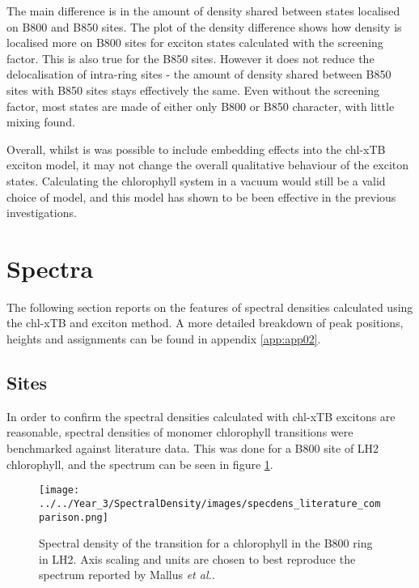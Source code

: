 The main difference is in the amount of density shared between states localised 
on B800 and B850 sites. The plot of the density difference shows how density is 
localised more on B800 sites for exciton states calculated with the screening
factor. This is also true for the B850 sites. However it does not reduce the delocalisation
of intra-ring sites - the amount of density shared between B850 sites with B850 
sites stays effectively the same. Even without the screening factor, most states
are made of either only B800 or B850 character, with little mixing found.

Overall, whilst is was possible to include embedding effects into the chl-xTB exciton
model, it may not change the overall qualitative behaviour of the exciton states.
Calculating the chlorophyll system in a vacuum would still be a valid choice of
model, and this model has shown to be been effective in the previous investigations.

\section{Spectra}
\label{sec:sites_states_couplings}

The following section reports on the features of spectral densities calculated using
the chl-xTB and exciton method. A more detailed breakdown of peak positions, heights
and assignments can be found in appendix \ref{app:app02}.

\subsection{Sites}
\label{subsec:sites}

In order to confirm the spectral densities calculated with chl-xTB excitons are 
reasonable, spectral densities of monomer chlorophyll \Qy transitions were benchmarked 
against literature data. This was done for a B800 site of LH2 chlorophyll, and the
spectrum can be seen in figure \ref{fig:specdens_lit}.

\begin{figure}
    \centering
    \texttt{[image: ../../Year\_3/SpectralDensity/images/specdens\_literature\_comparison.png]}
    \label{fig:specdens_lit}
    \caption{Spectral density of the \Qy transition for a chlorophyll in the B800
    ring in LH2. Axis scaling and units are chosen to best reproduce the spectrum
    reported by Mallus \emph{et al.}\cite{Mallus2018}.}
\end{figure}

